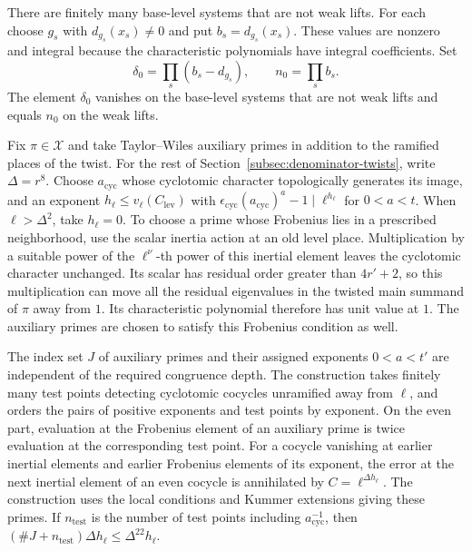 There are finitely many base-level systems that are not weak lifts.
For each choose \(g_s\) with \(d_{g_s}(x_s)\ne0\) and put
\(b_s=d_{g_s}(x_s)\). These values are nonzero and integral because
the characteristic polynomials have integral coefficients. Set
\[
 \delta_0=\prod_s(b_s-d_{g_s}),\qquad n_0=\prod_s b_s .
\]
The element \(\delta_0\) vanishes on the base-level systems that
are not weak lifts and equals \(n_0\) on the weak lifts.

Fix \(\pi\in\mathcal X\) and take Taylor--Wiles auxiliary primes in
addition to the ramified places of the twist. For the rest of Section~\ref{subsec:denominator-twists}, write \(\Delta=r^8\).
Choose \(a_{\mathrm{cyc}}\) whose cyclotomic character topologically
generates its image, and an exponent \(h_\ell\le v_\ell(C_{\mathrm{lev}})\)
with \(\epsilon_{\mathrm{cyc}}(a_{\mathrm{cyc}})^a-1\mid\ell^{h_\ell}\)
for \(0<a<t\). When \(\ell>\Delta^2\), take \(h_\ell=0\).
To choose a prime whose Frobenius lies in a prescribed neighborhood,
use the scalar inertia action at an old level place. Multiplication
by a suitable power of the \(\ell^\nu\)-th power of this inertial
element leaves the cyclotomic character unchanged. Its scalar has
residual order greater than \(4r'+2\), so this multiplication can
move all the residual eigenvalues in the twisted main summand
of \(\pi\) away from \(1\). Its characteristic polynomial therefore
has unit value at \(1\). The auxiliary primes are chosen to
satisfy this Frobenius condition as well.

The index set \(J\) of auxiliary primes and their assigned exponents
\(0<a<t'\) are independent of the required congruence depth. The
construction takes finitely many test points detecting cyclotomic
cocycles unramified away from \(\ell\), and orders the pairs of
positive exponents and test points by exponent. On the even part,
evaluation at the Frobenius element of an auxiliary prime is twice
evaluation at the corresponding test point. For a cocycle vanishing
at earlier inertial elements and earlier Frobenius elements of
its exponent, the error at the next inertial element of an even cocycle is annihilated
by \(C=\ell^{\Delta h_\ell}\). The construction uses the local
conditions and Kummer extensions giving these primes.
If \(n_{\mathrm{test}}\) is the number of test points including
\(a_{\mathrm{cyc}}^{-1}\), then
\((\#J+n_{\mathrm{test}})\Delta h_\ell\le\Delta^{22}h_\ell\).

